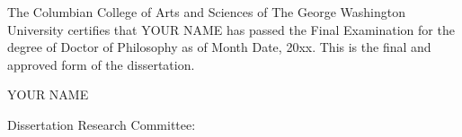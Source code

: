 \baselineskip=25pt
\noindent The Columbian College of Arts and Sciences of The George Washington University certifies 
that { YOUR NAME} has passed the Final Examination for the degree of Doctor of Philosophy as of {Month Date, 20xx}. This is the final and approved form of the dissertation. \\

\begin{center}
\end{center}
\begin{center}

{YOUR NAME}

\end{center}
\vskip 0.5in
\noindent
Dissertation Research Committee:
